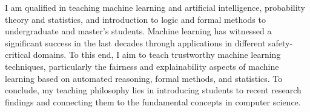 \documentclass[11pt]{article}
\begin{document}
		I am qualified in teaching machine learning and artificial intelligence, probability theory and statistics, and introduction to logic and formal methods to undergraduate and master's students. Machine learning has witnessed a significant success in the last decades through applications in different safety-critical domains. To this end, I aim to teach trustworthy machine learning techniques, particularly the fairness and explainability aspects of machine learning based on automated reasoning, formal methods, and statistics. To conclude, my teaching philosophy lies in introducing students to recent research findings and connecting them to the fundamental concepts in computer science.
		
		
\end{document}
